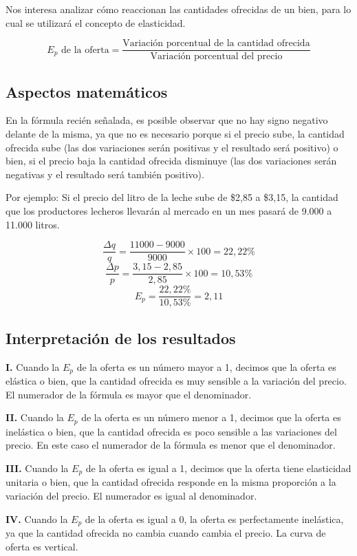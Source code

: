 \documentclass[12pt,a4paper]{article}
\begin{document}
Nos interesa analizar cómo reaccionan las cantidades ofrecidas de un bien, para lo cual se utilizará el concepto de elasticidad.

\[
E_p \text{ de la oferta} = \frac{\text{Variación porcentual de la cantidad ofrecida}}{\text{Variación porcentual del precio}}
\]

\subsection{Aspectos matemáticos}

En la fórmula recién señalada, es posible observar que no hay signo negativo delante de la misma, ya que no es necesario porque si el precio sube, la cantidad ofrecida sube (las dos variaciones serán positivas y el resultado será positivo) o bien, si el precio baja la cantidad ofrecida disminuye (las dos variaciones serán negativas y el resultado será también positivo).

Por ejemplo: Si el precio del litro de la leche sube de \$2,85 a \$3,15, la cantidad que los productores lecheros llevarán al mercado en un mes pasará de 9.000 a 11.000 litros.

\[
\frac{\Delta q}{q} = \frac{11000 - 9000}{9000} \times 100 = 22,22\%
\]
\[
\frac{\Delta p}{p} = \frac{3,15 - 2,85}{2,85} \times 100 = 10,53\%
\]
\[
E_p = \frac{22,22\%}{10,53\%} = 2,11
\]

\subsection{Interpretación de los resultados}

\textbf{I.} Cuando la $E_p$ de la oferta es un número mayor a 1, decimos que la oferta es elástica o bien, que la cantidad ofrecida es muy sensible a la variación del precio. El numerador de la fórmula es mayor que el denominador.

\textbf{II.} Cuando la $E_p$ de la oferta es un número menor a 1, decimos que la oferta es inelástica o bien, que la cantidad ofrecida es poco sensible a las variaciones del precio. En este caso el numerador de la fórmula es menor que el denominador.

\textbf{III.} Cuando la $E_p$ de la oferta es igual a 1, decimos que la oferta tiene elasticidad unitaria o bien, que la cantidad ofrecida responde en la misma proporción a la variación del precio. El numerador es igual al denominador.

\textbf{IV.} Cuando la $E_p$ de la oferta es igual a 0, la oferta es perfectamente inelástica, ya que la cantidad ofrecida no cambia cuando cambia el precio. La curva de oferta es vertical.
\end{document}
